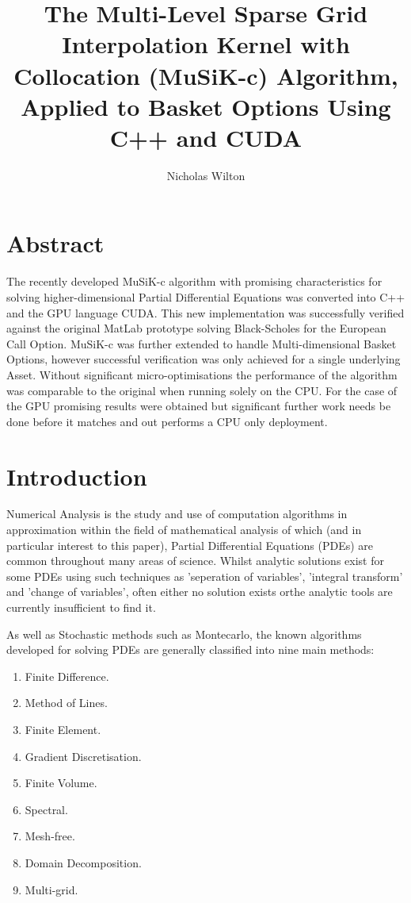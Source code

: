 \documentclass[a4paper]{amsart}
\begin{document}
\title[Multi-Level Sparse Grid Interpolation Kernel with Collocation (MuSiK-c) Algorithm]
{The Multi-Level Sparse Grid Interpolation Kernel with Collocation (MuSiK-c) Algorithm, Applied to Basket Options Using C++ and CUDA}
\author[Nicholas Wilton]{Nicholas Wilton}


\maketitle

\newpage
\tableofcontents
\newpage

\section {Abstract}
The recently developed MuSiK-c algorithm with promising characteristics for solving higher-dimensional Partial Differential Equations was converted into C++ and the GPU language CUDA. This new implementation was successfully verified against the original MatLab prototype solving Black-Scholes for the European Call Option. MuSiK-c was further extended to handle Multi-dimensional Basket Options, however successful verification was only achieved for a single underlying Asset. Without significant micro-optimisations the performance of the algorithm was comparable to the original when running solely on the CPU. For the case of the GPU promising results were obtained but significant further work needs be done before it matches and out performs a CPU only deployment.
\newpage

\section{Introduction}

Numerical Analysis is the study and use of computation algorithms in approximation within the field of mathematical analysis of which (and in particular interest to this paper), Partial Differential Equations (PDEs) are common throughout many areas of science. Whilst analytic solutions exist for some PDEs using such techniques as 'seperation of variables', 'integral transform' and 'change of variables', often either no solution exists orthe analytic tools are currently insufficient to find it.   

As well as Stochastic methods such as Montecarlo, the known algorithms developed for solving PDEs are generally classified into nine main methods:\\
\renewcommand{\labelenumi}{\arabic{enumi}}
\begin{enumerate}
\item  Finite Difference.
\item  Method of Lines.
\item  Finite Element.
\item  Gradient Discretisation.
\item  Finite Volume.
\item  Spectral.
\item  Mesh-free.
\item  Domain Decomposition.
\item  Multi-grid.
\end{enumerate}
\end{document}
